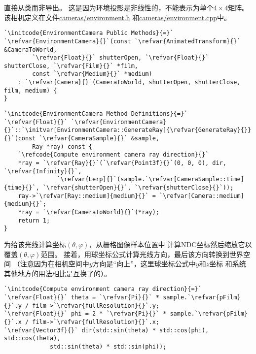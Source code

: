 直接从类而非导出。
这是因为环境投影是非线性的，不能表示为单个$4\times4$矩阵。
该相机定义在文件\href{https://github.com/mmp/pbrt-v3/tree/master/src/cameras/environment.h}{\ttfamily cameras/environment.h}
和\href{https://github.com/mmp/pbrt-v3/blob/master/src/cameras/environment.cpp}{\ttfamily cameras/environment.cpp}中。
\begin{lstlisting}
`\initcode{EnvironmentCamera Public Methods}{=}`
`\refvar{EnvironmentCamera}{}`(const `\refvar{AnimatedTransform}{}` &CameraToWorld,
        `\refvar{Float}{}` shutterOpen, `\refvar{Float}{}` shutterClose, `\refvar{Film}{}` *film,
        const `\refvar{Medium}{}` *medium)
    : `\refvar{Camera}{}`(CameraToWorld, shutterOpen, shutterClose, film, medium) {
}
\end{lstlisting}
\begin{lstlisting}
`\initcode{EnvironmentCamera Method Definitions}{=}`
`\refvar{Float}{}` `\refvar{EnvironmentCamera}{}`::`\initvar[EnvironmentCamera::GenerateRay]{\refvar{GenerateRay}{}}{}`(const `\refvar{CameraSample}{}` &sample,
        Ray *ray) const {
    `\refcode{Compute environment camera ray direction}{}`
    *ray = `\refvar{Ray}{}`(`\refvar{Point3f}{}`(0, 0, 0), dir, `\refvar{Infinity}{}`,
               `\refvar{Lerp}{}`(sample.`\refvar[CameraSample::time]{time}{}`, `\refvar{shutterOpen}{}`, `\refvar{shutterClose}{}`));
    ray->`\refvar[Ray::medium]{medium}{}` = `\refvar[Camera::medium]{medium}{}`;
    *ray = `\refvar{CameraToWorld}{}`(*ray);
    return 1;
}
\end{lstlisting}

为给该光线计算坐标$(\theta,\varphi)$，从栅格图像样本位置中
计算NDC坐标然后缩放它以覆盖$(\theta,\varphi)$范围。
接着，用球坐标公式计算光线方向，最后该方向转换到世界空间
（注意因为在相机空间中$y$方向是“向上”，这里球坐标公式中$y$和$z$坐标
和系统其他地方的用法相比是互换了的）。
\begin{lstlisting}
`\initcode{Compute environment camera ray direction}{=}`
`\refvar{Float}{}` theta = `\refvar{Pi}{}` * sample.`\refvar{pFilm}{}`.y / film->`\refvar{fullResolution}{}`.y;
`\refvar{Float}{}` phi = 2 * `\refvar{Pi}{}` * sample.`\refvar{pFilm}{}`.x / film->`\refvar{fullResolution}{}`.x;
`\refvar{Vector3f}{}` dir(std::sin(theta) * std::cos(phi), std::cos(theta),
             std::sin(theta) * std::sin(phi));
\end{lstlisting}